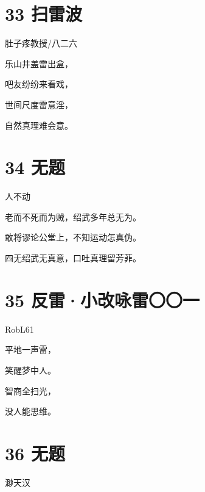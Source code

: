 \documentclass[UTF8,12pt,oneside]{ctexbook}
\begin{document}
        \section{33 扫雷波}
        \begin{center}
            肚子疼教授/八二六
        \end{center}
        
        \begin{center}
            乐山井盖雷出盒，
            
            吧友纷纷来看戏，
            
            世间尺度雷意淫，
            
            自然真理难会意。
        \end{center}
        
        \newpage
        
        \section{34 无题}
        \begin{center}
            人不动
        \end{center}
        
        \begin{center}
            老而不死而为贼，绍武多年总无为。
            
            敢将谬论公堂上，不知运动怎真伪。
            
            四无绍武无真意，口吐真理留芳菲。
        \end{center}
        
        \section{35 反雷·小改咏雷〇〇一}
        \begin{center}
            RobL61
        \end{center}
        
        \begin{center}
            平地一声雷，
            
            笑醒梦中人。
            
            智商全扫光，
            
            没人能思维。
        \end{center}
        
        \section{36 无题}
        \begin{center}
            渺天汉
        \end{center}
        
\end{document}
